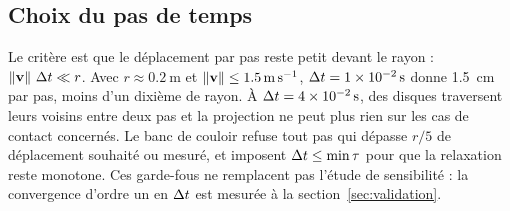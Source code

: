 \subsection{Choix du pas de temps}

Le critère est que le déplacement par pas reste petit devant le rayon :
$\left\lVert \mathbf{v} \right\rVert\,\Delta t\ll r$. Avec $r\approx\SI{0.2}{\metre}$ et
$\left\lVert \mathbf{v} \right\rVert\leq\SI{1.5}{\metre\per\second}$, $\Delta t=\SI{1e-2}{\second}$ donne
\SI{1.5}{\centi\metre} par pas, moins d'un dixième de rayon. À
$\Delta t=\SI{4e-2}{\second}$, des disques traversent leurs voisins entre deux pas et
la projection ne peut plus rien sur les cas de contact concernés. Le banc de couloir refuse tout pas qui
dépasse $r/5$ de déplacement souhaité ou mesuré, et imposent
$\Delta t\leq\min\tau$ pour que la relaxation reste monotone. Ces garde-fous ne
remplacent pas l'étude de sensibilité : la convergence d'ordre un en $\Delta t$ est
mesurée à la section~\ref{sec:validation}.
